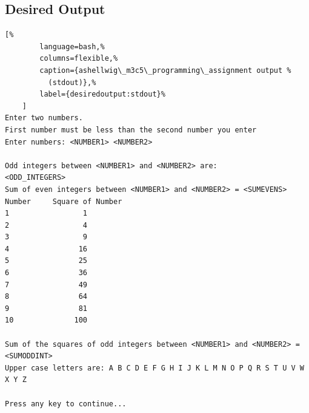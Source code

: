 \documentclass[a4paper, 11pt]{article}
\begin{document}
    \subsection{Desired Output}
      \begin{lstlisting}[%
        language=bash,%
        columns=flexible,%
        caption={ashellwig\_m3c5\_programming\_assignment output %
          (stdout)},%
        label={desiredoutput:stdout}%
    ]
Enter two numbers.
First number must be less than the second number you enter
Enter numbers: <NUMBER1> <NUMBER2>

Odd integers between <NUMBER1> and <NUMBER2> are:
<ODD_INTEGERS>
Sum of even integers between <NUMBER1> and <NUMBER2> = <SUMEVENS>
Number     Square of Number
1                 1
2                 4
3                 9
4                16
5                25
6                36
7                49
8                64
9                81
10              100

Sum of the squares of odd integers between <NUMBER1> and <NUMBER2> = <SUMODDINT>
Upper case letters are: A B C D E F G H I J K L M N O P Q R S T U V W X Y Z

Press any key to continue...
      \end{lstlisting}


  \newpage
\end{document}
